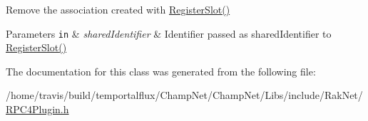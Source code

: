 Remove the association created with \hyperlink{class_rak_net_1_1_r_p_c4_a923fe77794363d8ec6094da98fd40d03}{Register\-Slot()} 
\begin{DoxyParams}[1]{Parameters}
\mbox{\tt in}  & {\em shared\-Identifier} & Identifier passed as shared\-Identifier to \hyperlink{class_rak_net_1_1_r_p_c4_a923fe77794363d8ec6094da98fd40d03}{Register\-Slot()} \\
\hline
\end{DoxyParams}


The documentation for this class was generated from the following file\-:\begin{DoxyCompactItemize}
\item 
/home/travis/build/temportalflux/\-Champ\-Net/\-Champ\-Net/\-Libs/include/\-Rak\-Net/\hyperlink{_r_p_c4_plugin_8h}{R\-P\-C4\-Plugin.\-h}\end{DoxyCompactItemize}
